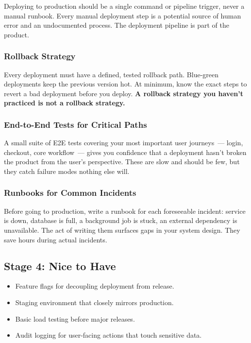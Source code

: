Deploying to production should be a single command or pipeline trigger, never a manual runbook. Every manual deployment step is a potential source of human error and an undocumented process. The deployment pipeline is part of the product.

\subsubsection*{Rollback Strategy}\label{writing-good-code:rollback-strategy}

Every deployment must have a defined, tested rollback path. Blue-green deployments keep the previous version hot. At minimum, know the exact steps to revert a bad deployment before you deploy. \textbf{A rollback strategy you haven't practiced is not a rollback strategy.}

\subsubsection*{End-to-End Tests for Critical Paths}\label{writing-good-code:end-to-end-tests-for-critical-paths}

A small suite of E2E tests covering your most important user journeys~--- login, checkout, core workflow~--- gives you confidence that a deployment hasn't broken the product from the user's perspective. These are slow and should be few, but they catch failure modes nothing else will.

\subsubsection*{Runbooks for Common Incidents}\label{writing-good-code:runbooks-for-common-incidents}

Before going to production, write a runbook for each foreseeable incident: service is down, database is full, a background job is stuck, an external dependency is unavailable. The act of writing them surfaces gaps in your system design. They save hours during actual incidents.

\subsection*{Stage 4: Nice to Have}\label{writing-good-code:stage-4-nice-to-have}

\begin{itemize}
\tightlist
\item
  Feature flags for decoupling deployment from release.
\item
  Staging environment that closely mirrors production.
\item
  Basic load testing before major releases.
\item
  Audit logging for user-facing actions that touch sensitive data.
\end{itemize}

